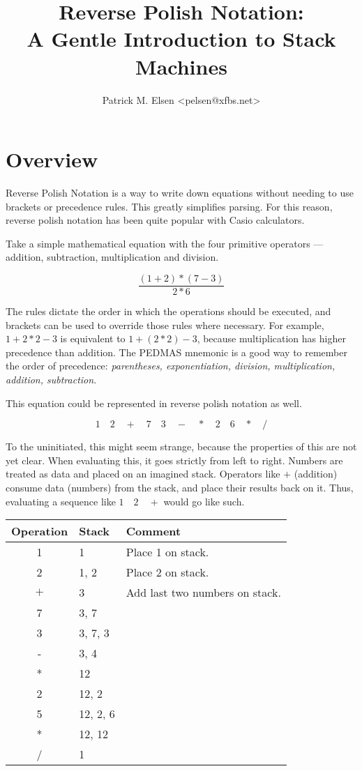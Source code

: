 \documentclass[a4paper,twocolumn]{article}
\title{Reverse Polish Notation:\\A Gentle Introduction to Stack Machines}
\author{Patrick M. Elsen <pelsen@xfbs.net>}
\date{}
\begin{document}
\maketitle
\tableofcontents

\section{Overview}

Reverse Polish Notation is a way to write down equations without needing to use brackets or precedence rules. This greatly simplifies parsing. For this reason, reverse polish notation has been quite popular with Casio calculators.

Take a simple mathematical equation with the four primitive operators — addition, subtraction, multiplication and division.

\begin{equation}
  \frac{(1 + 2) * (7 - 3)}{2 * 6}
\end{equation}

The rules dictate the order in which the operations should be executed, and brackets can be used to override those rules where necessary. For example, $1 + 2 * 2 - 3$ is equivalent to $1 + (2 * 2) - 3$, because multiplication has higher precedence than addition. The PEDMAS mnemonic is a good way to remember the order of precedence: \emph{parentheses, exponentiation, division, multiplication, addition, subtraction}. 

This equation could be represented in reverse polish notation as well.

\begin{equation}
1\quad2\quad+\quad7\quad3\quad-\quad*\quad2\quad6\quad*\quad/  
\end{equation}

To the uninitiated, this might seem strange, because the properties of this are not yet clear. When evaluating this, it goes strictly from left to right. Numbers are treated as data and placed on an imagined stack. Operators like $+$ (addition) consume data (numbers) from the stack, and place their results back on it. Thus, evaluating a sequence like $1\quad2\quad+$ would go like such.

\begin{table}[h!]
\begin{tabular}{@{}clp{4cm}@{}}
\toprule
Operation & Stack & Comment\\
\midrule
1 & 1 & Place 1 on stack.\\
2 & 1, 2 & Place 2 on stack.\\
$+$ & 3 & Add last two numbers on stack.\\
7 & 3, 7\\
3 & 3, 7, 3\\
- & 3, 4\\
* & 12\\
2 & 12, 2\\
5 & 12, 2, 6\\
* & 12, 12\\
/ & 1\\
\bottomrule  
\end{tabular}
\end{table}
\end{document}
